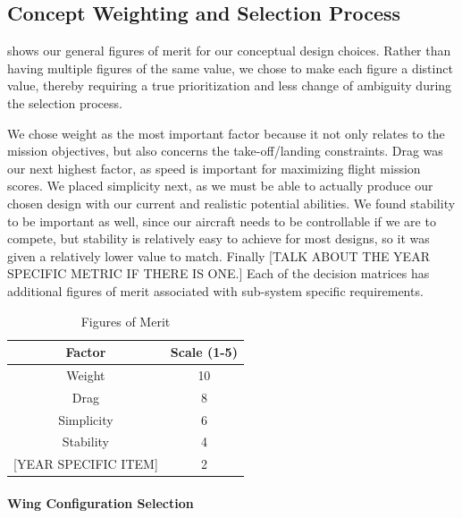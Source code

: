 \documentclass[report]{byu-aero}
\begin{document}
\subsection{Concept Weighting and Selection Process}
\label{ssec:selectionprocess}

 shows our general figures of merit for our conceptual design choices. Rather than having multiple figures of the same value, we chose to make each figure a distinct value, thereby requiring a true prioritization and less change of ambiguity during the selection process.

We chose weight as the most important factor because it not only relates to the mission objectives, but also concerns the take-off/landing constraints.  Drag was our next highest factor, as speed is important for maximizing flight mission scores.  We placed simplicity next, as we must be able to actually produce our chosen design with our current and realistic potential abilities.  We found stability to be important as well, since our aircraft needs to be controllable if we are to compete, but stability is relatively easy to achieve for most designs, so it was given a relatively lower value to match.  Finally {\color{\BYUred}[TALK ABOUT THE YEAR SPECIFIC METRIC IF THERE IS ONE.]} Each of the decision matrices has additional figures of merit associated with sub-system specific requirements.

\begin{table}[h!]
	\centering
	\caption{Figures of Merit}
	\label{tab:fom}
	\begin{tabular}{ |c|c| } 
		\hline
		\rowcolor{BYUbluemid}
		Factor & Scale (1-5) \\
		\hline
		Weight & 10 \\
		\hline
		Drag & 8 \\
		\hline
		Simplicity & 6 \\
		\hline
		Stability & 4 \\
		\hline
		{\color{\BYUred} {\color{BYUred} [YEAR SPECIFIC ITEM]}} & 2 \\
		\hline
	\end{tabular}
\end{table}


\paragraph{Wing Configuration Selection}
\end{document}
